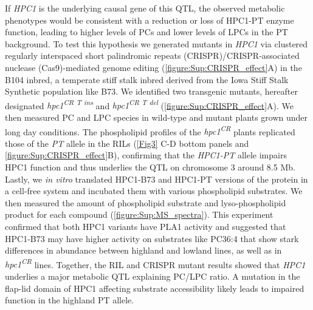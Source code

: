 \documentclass[9pt,twocolumn,twoside,lineno]{biorxiv}
\newcommand{\hpc}{\textit{HPC1}\xspace}
\begin{document}
If \hpc is the underlying causal gene of this QTL, the observed metabolic phenotypes would be consistent with a reduction or loss of HPC1-PT enzyme function, leading to higher levels of PCs and lower levels of LPCs in the PT background. 
To test this hypothesis we generated mutants in \hpc via clustered regularly interspaced short palindromic repeats (CRISPR)/CRISPR-associated nuclease (Cas9)-mediated genome editing (\cref{figure:Sup:CRISPR_effect}A) in the B104 inbred, a temperate stiff stalk inbred derived from the Iowa Stiff Stalk Synthetic population like B73. 
We identified two transgenic mutants, hereafter designated \textit{hpc1\textsuperscript{CR T ins}} and \textit{hpc1\textsuperscript{CR T del}} (\cref{figure:Sup:CRISPR_effect}A).
We then measured PC and LPC species in wild-type and mutant plants grown under long day conditions.  
The phospholipid profiles of the \textit{hpc1\textsuperscript{CR}} plants 
replicated those of the \textit{PT} allele in the RILs (\cref{Fig3} C-D bottom panels and \cref{figure:Sup:CRISPR_effect}B), confirming that the \textit{HPC1-PT} allele impairs HPC1 function and thus underlies the QTL on chromosome 3 around 8.5 Mb. 
Lastly, we \textit{in vitro} translated HPC1-B73 and HPC1-PT  versions of the protein in a cell-free system and incubated them with various phospholipid substrates. 
We then measured the amount of phospholipid substrate and lyso-phospholipid product for each compound (\cref{figure:Sup:MS_spectra}). 
This experiment confirmed that both HPC1 variants have PLA1 activity and suggested that HPC1-B73 may have higher activity on substrates like PC36:4 that show stark differences in abundance between highland and lowland lines, as well as in \textit{hpc1\textsuperscript{CR}} lines.
Together, the RIL and CRISPR mutant results showed that \hpc underlies a major metabolic QTL explaining PC/LPC ratio. 
A mutation in the flap-lid domain of HPC1 affecting substrate accessibility likely leads to impaired function in the highland PT allele.
\end{document}
